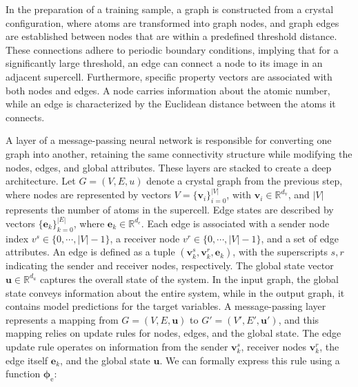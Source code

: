     In the preparation of a training sample, a graph is constructed from a crystal configuration, where atoms are transformed into graph nodes, and graph edges are established between nodes that are within a predefined threshold distance. These connections adhere to periodic boundary conditions, implying that for a significantly large threshold, an edge can connect a node to its image in an adjacent supercell. Furthermore, specific property vectors are associated with both nodes and edges. A node carries information about the atomic number, while an edge is characterized by the Euclidean distance between the atoms it connects.
    
    A layer of a message-passing neural network is responsible for converting one graph into another, retaining the same connectivity structure while modifying the nodes, edges, and global attributes. These layers are stacked to create a deep architecture. Let $G = (V, E, u)$ denote a crystal graph from the previous step, where nodes are represented by vectors $V = \{\mathbf{v}_i\}_{i=0}^{|V|}$, with $\mathbf{v}_i \in \mathbb{R}^{d_\text{v}}$, and $|V|$ represents the number of atoms in the supercell. Edge states are described by vectors $\{\mathbf{e}_k\}_{k=0}^{|E|}$, where $\mathbf{e}_k \in \mathbb{R}^{d_e}$. Each edge is associated with a sender node index $v^s \in \{0, \cdots, |V|-1\}$, a receiver node $v^r \in \{0, \cdots, |V|-1\}$, and a set of edge attributes. An edge is defined as a tuple $(\mathbf{v}_k^s, \mathbf{v}_k^r, \mathbf{e}_k)$, with the superscripts $s, r$ indicating the sender and receiver nodes, respectively. The global state vector $\mathbf{u} \in \mathbb{R}^{d_u}$ captures the overall state of the system. In the input graph, the global state conveys information about the entire system, while in the output graph, it contains model predictions for the target variables. A message-passing layer represents a mapping from $G = (V, E, \mathbf{u})$ to $G' = (V', E', \mathbf{u}')$, and this mapping relies on update rules for nodes, edges, and the global state. The edge update rule operates on information from the sender $\mathbf{v}_k^s$, receiver nodes $\mathbf{v}_k^r$, the edge itself $\mathbf{e}_k$, and the global state $\mathbf{u}$. We can formally express this rule using a function $\mathbf{\phi}_\text{e}$:
    
